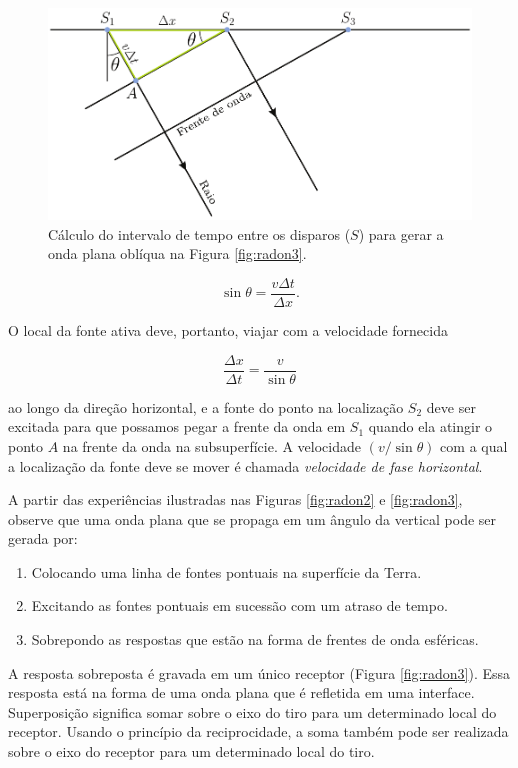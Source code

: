 \begin{figure}[H]
\centering
\includegraphics[width=12cm]{figuras/cap2/radon4.pdf}
\caption{Cálculo do intervalo de tempo entre os disparos ($S$) para gerar a onda plana oblíqua na Figura \ref{fig:radon3}.}
\label{fig:radon4}
\end{figure}

\begin{equation}
\sin \theta=\frac{v \Delta t}{\Delta x}.
\label{eq:6_1}
\end{equation}

O local da fonte ativa deve, portanto, viajar com a velocidade fornecida

\begin{equation}
\frac{\Delta x}{\Delta t}=\frac{v}{\sin \theta}
\label{eq:6_2}
\end{equation}

ao longo da direção horizontal, e a fonte do ponto na localização $S_2$ deve ser excitada para que possamos pegar a frente da onda em $S_1$ quando ela atingir o ponto $A$ na frente da onda na subsuperfície. A velocidade $(v/\sin\theta)$ com a qual a localização da fonte deve se mover é chamada \textit{velocidade de fase horizontal}.

A partir das experiências ilustradas nas Figuras \ref{fig:radon2} e \ref{fig:radon3}, observe que uma onda plana que se propaga em um ângulo da vertical pode ser gerada por:
\begin{enumerate}
 \item Colocando uma linha de fontes pontuais na superfície da Terra.
 \item Excitando as fontes pontuais em sucessão com um atraso de tempo.
 \item Sobrepondo as respostas que estão na forma de frentes de onda esféricas.
\end{enumerate}

A resposta sobreposta é gravada em um único receptor (Figura \ref{fig:radon3}). Essa resposta está na forma de uma onda plana que é refletida em uma interface. Superposição significa somar sobre o eixo do tiro para um determinado local do receptor. Usando o princípio da reciprocidade, a soma também pode ser realizada sobre o eixo do receptor para um determinado local do tiro.

